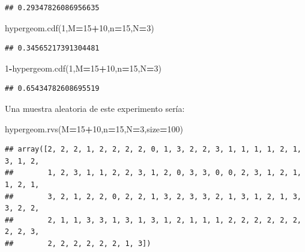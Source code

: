 \documentclass[]{book}
\newenvironment{Shaded}{\begin{snugshade}}{\end{snugshade}}
\newcommand{\DecValTok}[1]{\textcolor[rgb]{0.00,0.00,0.81}{#1}}
\newcommand{\NormalTok}[1]{#1}
\newcommand{\OperatorTok}[1]{\textcolor[rgb]{0.81,0.36,0.00}{\textbf{#1}}}
\begin{document}
\begin{verbatim}
## 0.29347826086956635
\end{verbatim}

\begin{Shaded}
\begin{Highlighting}[]
\NormalTok{hypergeom.cdf(}\DecValTok{1}\NormalTok{,M}\OperatorTok{=}\DecValTok{15}\OperatorTok{+}\DecValTok{10}\NormalTok{,n}\OperatorTok{=}\DecValTok{15}\NormalTok{,N}\OperatorTok{=}\DecValTok{3}\NormalTok{)}
\end{Highlighting}
\end{Shaded}

\begin{verbatim}
## 0.34565217391304481
\end{verbatim}

\begin{Shaded}
\begin{Highlighting}[]
\DecValTok{1}\OperatorTok{-}\NormalTok{hypergeom.cdf(}\DecValTok{1}\NormalTok{,M}\OperatorTok{=}\DecValTok{15}\OperatorTok{+}\DecValTok{10}\NormalTok{,n}\OperatorTok{=}\DecValTok{15}\NormalTok{,N}\OperatorTok{=}\DecValTok{3}\NormalTok{)}
\end{Highlighting}
\end{Shaded}

\begin{verbatim}
## 0.65434782608695519
\end{verbatim}

Una muestra aleatoria de este experimento sería:

\begin{Shaded}
\begin{Highlighting}[]
\NormalTok{hypergeom.rvs(M}\OperatorTok{=}\DecValTok{15}\OperatorTok{+}\DecValTok{10}\NormalTok{,n}\OperatorTok{=}\DecValTok{15}\NormalTok{,N}\OperatorTok{=}\DecValTok{3}\NormalTok{,size}\OperatorTok{=}\DecValTok{100}\NormalTok{)}
\end{Highlighting}
\end{Shaded}

\begin{verbatim}
## array([2, 2, 2, 1, 2, 2, 2, 2, 0, 1, 3, 2, 2, 3, 1, 1, 1, 1, 2, 1, 3, 1, 2,
##        1, 2, 3, 1, 1, 2, 2, 3, 1, 2, 0, 3, 3, 0, 0, 2, 3, 1, 2, 1, 1, 2, 1,
##        3, 2, 1, 2, 2, 0, 2, 2, 1, 3, 2, 3, 3, 2, 1, 3, 1, 2, 1, 3, 3, 2, 2,
##        2, 1, 1, 3, 3, 1, 3, 1, 3, 1, 2, 1, 1, 1, 2, 2, 2, 2, 2, 2, 2, 2, 3,
##        2, 2, 2, 2, 2, 2, 1, 3])
\end{verbatim}
\end{document}
